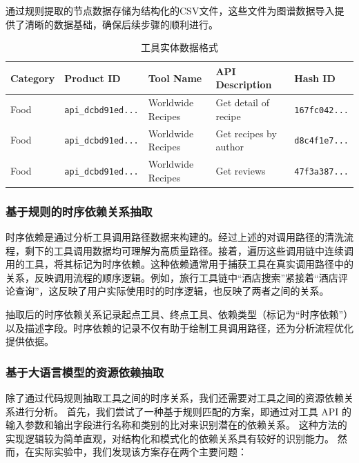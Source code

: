 通过规则提取的节点数据存储为结构化的CSV文件，这些文件为图谱数据导入提供了清晰的数据基础，确保后续步骤的顺利进行。

\begin{table}[ht]
\centering
\caption{工具实体数据格式}
\label{tab:csv-example}
\renewcommand{\arraystretch}{1.2}
\scriptsize %
\begin{tabular}{|l|l|l|p{6cm}|l|}
\hline
\textbf{Category} & \textbf{Product ID} & \textbf{Tool Name} & \textbf{API Description} & \textbf{Hash ID} \\ \hline
Food & \texttt{api\_dcbd91ed...} & Worldwide Recipes & Get detail of recipe & \texttt{167fc042...} \\ \hline
Food & \texttt{api\_dcbd91ed...} & Worldwide Recipes & Get recipes by author & \texttt{d8c4f1e7...} \\ \hline
Food & \texttt{api\_dcbd91ed...} & Worldwide Recipes & Get reviews & \texttt{47f3a387...} \\ \hline
\end{tabular}
\end{table}

\subsubsection{基于规则的时序依赖关系抽取}

时序依赖是通过分析工具调用路径数据来构建的。经过上述的对调用路径的清洗流程，剩下的工具调用数据均可理解为高质量路径。接着，遍历这些调用链中连续调用的工具，将其标记为时序依赖。这种依赖通常用于捕获工具在真实调用路径中的关系，反映调用流程的顺序逻辑。例如，旅行工具链中“酒店搜索”紧接着“酒店评论查询”，这反映了用户实际使用时的时序逻辑，也反映了两者之间的关系。

抽取后的时序依赖关系记录起点工具、终点工具、依赖类型（标记为“时序依赖”）以及描述字段。时序依赖的记录不仅有助于绘制工具调用路径，还为分析流程优化提供依据。

\subsubsection{基于大语言模型的资源依赖抽取}

除了通过代码规则抽取工具之间的时序关系，我们还需要对工具之间的资源依赖关系进行分析。
首先，我们尝试了一种基于规则匹配的方案，即通过对工具 API 的输入参数和输出字段进行名称和类别的比对来识别潜在的依赖关系。
这种方法的实现逻辑较为简单直观，对结构化和模式化的依赖关系具有较好的识别能力。
然而，在实际实验中，我们发现该方案存在两个主要问题：

